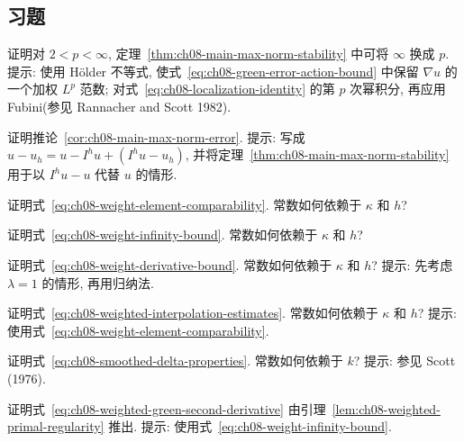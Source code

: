 \subsection{习题}
\label{sec:ch08-exercises}
\setcounter{exerciseitem}{0}

\begin{MBExercise}
\label{exr:ch08-01}
证明对 $2<p<\infty$, 定理~\ref{thm:ch08-main-max-norm-stability} 中可将 $\infty$ 换成 $p$. 提示: 使用 Hölder 不等式, 使式~\eqref{eq:ch08-green-error-action-bound} 中保留 $\nabla u$ 的一个加权 $L^p$ 范数; 对式~\eqref{eq:ch08-localization-identity} 的第 $p$ 次幂积分, 再应用 Fubini(参见 Rannacher and Scott 1982).
\end{MBExercise}

\begin{MBExercise}
\label{exr:ch08-02}
证明推论~\ref{cor:ch08-main-max-norm-error}. 提示: 写成 $u-u_h=u-I^hu+(I^hu-u_h)$, 并将定理~\ref{thm:ch08-main-max-norm-stability} 用于以 $I^hu-u$ 代替 $u$ 的情形.
\end{MBExercise}

\begin{MBExercise}
\label{exr:ch08-03}
证明式~\eqref{eq:ch08-weight-element-comparability}. 常数如何依赖于 $\kappa$ 和 $h$?
\end{MBExercise}

\begin{MBExercise}
\label{exr:ch08-04}
证明式~\eqref{eq:ch08-weight-infinity-bound}. 常数如何依赖于 $\kappa$ 和 $h$?
\end{MBExercise}

\begin{MBExercise}
\label{exr:ch08-05}
证明式~\eqref{eq:ch08-weight-derivative-bound}. 常数如何依赖于 $\kappa$ 和 $h$? 提示: 先考虑 $\lambda=1$ 的情形, 再用归纳法.
\end{MBExercise}

\begin{MBExercise}
\label{exr:ch08-06}
证明式~\eqref{eq:ch08-weighted-interpolation-estimates}. 常数如何依赖于 $\kappa$ 和 $h$? 提示: 使用式~\eqref{eq:ch08-weight-element-comparability}.
\end{MBExercise}

\begin{MBExercise}
\label{exr:ch08-07}
证明式~\eqref{eq:ch08-smoothed-delta-properties}. 常数如何依赖于 $k$? 提示: 参见 Scott (1976).
\end{MBExercise}

\begin{MBExercise}
\label{exr:ch08-08}
证明式~\eqref{eq:ch08-weighted-green-second-derivative} 由引理~\ref{lem:ch08-weighted-primal-regularity} 推出. 提示: 使用式~\eqref{eq:ch08-weight-infinity-bound}.
\end{MBExercise}

